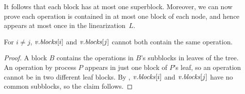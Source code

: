 It follows that each block has at most one superblock.
Moreover, we can now prove each operation is contained in at most one block of each node,
and hence appears at most once in the linearization~$L$.

\begin{corollary}\label{lem::noDuplicates}
For  $i\neq j$, $\mbox{\textnormal{\textit{v}}}.\mbox{\textit{blocks}}[i]$ and $\mbox{\textnormal{\textit{v}}}.\mbox{\textit{blocks}}[j]$ cannot both contain the same operation.
\end{corollary}
\begin{proof}
A block $B$ contains the operations in $B$'s subblocks in leaves of the tree.
An operation by process $P$ appears in just one block of $P$'s leaf, so
an operation 
cannot be in two different leaf blocks. 
By , $\mbox{\textnormal{\textit{v}}}.\mbox{\textit{blocks}}[i]$ and $\mbox{\textnormal{\textit{v}}}.\mbox{\textit{blocks}}[j]$ have no common subblocks, so the claim follows.
\end{proof}



%


